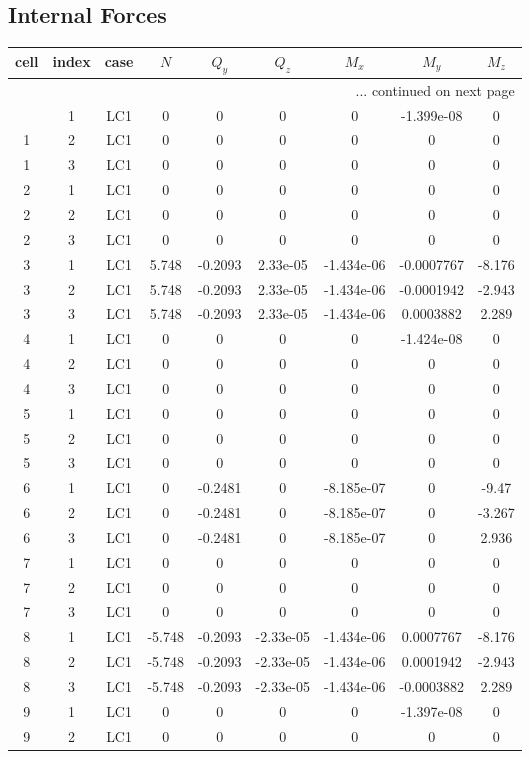 \documentclass{article}%
\begin{document}
\subsection{Internal Forces}%
\label{subsec:InternalForces}%
\begin{longtable}{| c c c | c c c c c c |}%
\hline%
cell&index&case&$N$&$Q_y$&$Q_z$&$M_x$&$M_y$&$M_z$\\%
\hline%
\endhead%
\hline%
\multicolumn{9}{r}{... continued on next page}\\%
\endfoot%
\hline%
\endlastfoot%
1&1&LC1&0&0&0&0&{-}1.399e{-}08&0\\%
1&2&LC1&0&0&0&0&0&0\\%
1&3&LC1&0&0&0&0&0&0\\%
2&1&LC1&0&0&0&0&0&0\\%
2&2&LC1&0&0&0&0&0&0\\%
2&3&LC1&0&0&0&0&0&0\\%
3&1&LC1&5.748&{-}0.2093&2.33e{-}05&{-}1.434e{-}06&{-}0.0007767&{-}8.176\\%
3&2&LC1&5.748&{-}0.2093&2.33e{-}05&{-}1.434e{-}06&{-}0.0001942&{-}2.943\\%
3&3&LC1&5.748&{-}0.2093&2.33e{-}05&{-}1.434e{-}06&0.0003882&2.289\\%
4&1&LC1&0&0&0&0&{-}1.424e{-}08&0\\%
4&2&LC1&0&0&0&0&0&0\\%
4&3&LC1&0&0&0&0&0&0\\%
5&1&LC1&0&0&0&0&0&0\\%
5&2&LC1&0&0&0&0&0&0\\%
5&3&LC1&0&0&0&0&0&0\\%
6&1&LC1&0&{-}0.2481&0&{-}8.185e{-}07&0&{-}9.47\\%
6&2&LC1&0&{-}0.2481&0&{-}8.185e{-}07&0&{-}3.267\\%
6&3&LC1&0&{-}0.2481&0&{-}8.185e{-}07&0&2.936\\%
7&1&LC1&0&0&0&0&0&0\\%
7&2&LC1&0&0&0&0&0&0\\%
7&3&LC1&0&0&0&0&0&0\\%
8&1&LC1&{-}5.748&{-}0.2093&{-}2.33e{-}05&{-}1.434e{-}06&0.0007767&{-}8.176\\%
8&2&LC1&{-}5.748&{-}0.2093&{-}2.33e{-}05&{-}1.434e{-}06&0.0001942&{-}2.943\\%
8&3&LC1&{-}5.748&{-}0.2093&{-}2.33e{-}05&{-}1.434e{-}06&{-}0.0003882&2.289\\%
9&1&LC1&0&0&0&0&{-}1.397e{-}08&0\\%
9&2&LC1&0&0&0&0&0&0\\%

\end{longtable}
\end{document}
